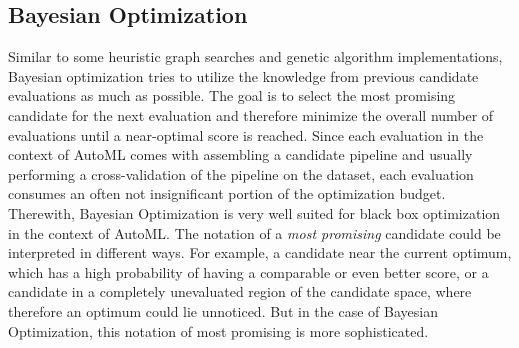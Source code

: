 \subsection{Bayesian Optimization}
\label{sec:theory:optimization:bayesian}
Similar to some heuristic graph searches and genetic algorithm implementations, Bayesian optimization tries to utilize the knowledge from previous candidate evaluations as much as possible.
The goal is to select the most promising candidate for the next evaluation and therefore minimize the overall number of evaluations until a near-optimal score is reached.
Since each evaluation in the context of AutoML comes with assembling a candidate pipeline and usually performing a cross-validation of the pipeline on the dataset, each evaluation consumes an often not insignificant portion of the optimization budget.
Therewith, Bayesian Optimization is very well suited for black box optimization in the context of AutoML.\newline
The notation of a \textit{most promising} candidate could be interpreted in different ways.
For example, a candidate near the current optimum, which has a high probability of having a comparable or even better score, or a candidate in a completely unevaluated region of the candidate space, where therefore an optimum could lie unnoticed.
But in the case of Bayesian Optimization, this notation of most promising is more sophisticated.

